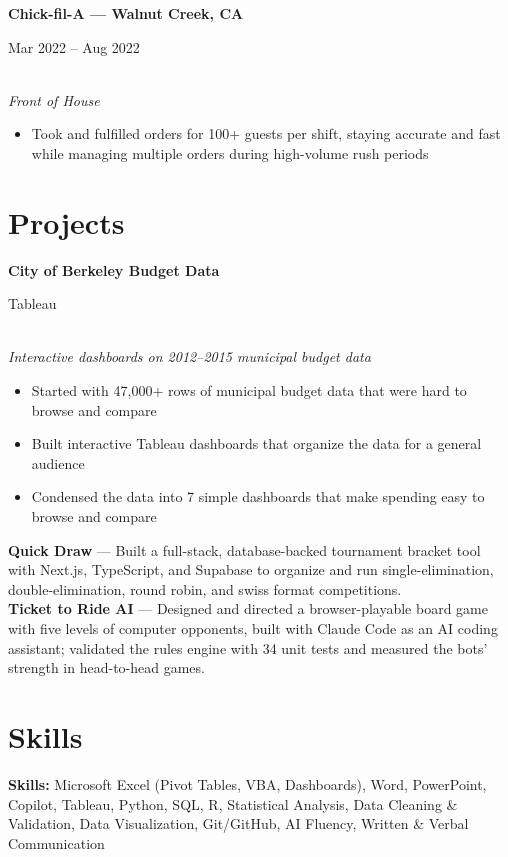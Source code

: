 \documentclass[11pt,letterpaper]{article}
\newcommand{\entry}[3]{%
  \noindent\begin{minipage}[t]{0.72\textwidth}\raggedright\textbf{#1}\end{minipage}%
  \hfill\begin{minipage}[t]{0.26\textwidth}\raggedleft\small\color{gray}#2\end{minipage}\\
  \textit{#3}\par\vspace{2pt}
}
\newcommand{\entryhl}[3]{%
  \noindent\begin{minipage}[t]{0.72\textwidth}\raggedright\textbf{\color{accent}#1}\end{minipage}%
  \hfill\begin{minipage}[t]{0.26\textwidth}\raggedleft\small\color{gray}#2\end{minipage}\\
  \textit{#3}\par\vspace{2pt}
}
\begin{document}
\entry{Chick-fil-A --- Walnut Creek, CA}{Mar 2022 -- Aug 2022}{Front of House}
\begin{itemize}
  \item Took and fulfilled orders for 100+ guests per shift, staying accurate and fast while managing multiple orders during high-volume rush periods
\end{itemize}

\section*{Projects}

\entryhl{City of Berkeley Budget Data}{Tableau}{Interactive dashboards on 2012--2015 municipal budget data}
\begin{itemize}
  \item Started with 47,000+ rows of municipal budget data that were hard to browse and compare
  \item Built interactive Tableau dashboards that organize the data for a general audience
  \item Condensed the data into 7 simple dashboards that make spending easy to browse and compare
\end{itemize}

\noindent\textbf{Quick Draw} --- Built a full-stack, database-backed tournament bracket tool with Next.js, TypeScript, and Supabase to organize and run single-elimination, double-elimination, round robin, and swiss format competitions.\\[4pt]
\textbf{Ticket to Ride AI} --- Designed and directed a browser-playable board game with five levels of computer opponents, built with Claude Code as an AI coding assistant; validated the rules engine with 34 unit tests and measured the bots' strength in head-to-head games.

\section*{Skills}
\textbf{Skills:} Microsoft Excel (Pivot Tables, VBA, Dashboards), Word, PowerPoint, Copilot, Tableau, Python, SQL, R, Statistical Analysis, Data Cleaning \& Validation, Data Visualization, Git/GitHub, AI Fluency, Written \& Verbal Communication
\end{document}
